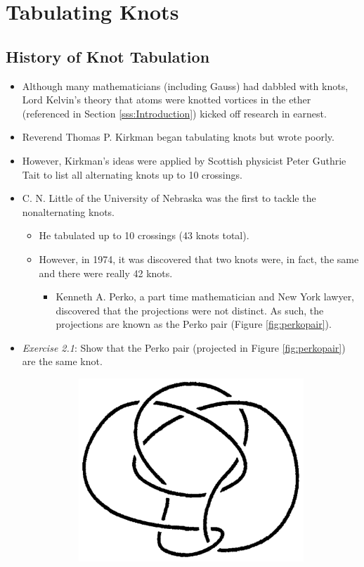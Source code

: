 \documentclass[titlepage]{article}
\numberwithin{figure}{section}
\numberwithin{table}{section}
\numberwithin{equation}{section}
\begin{document}
\section{Tabulating Knots}\label{sse:tabulating}
\subsection{History of Knot Tabulation}
\begin{itemize}
    \item Although many mathematicians (including Gauss) had dabbled with knots, Lord Kelvin's theory that atoms were knotted vortices in the ether (referenced in Section \ref{sss:Introduction}) kicked off research in earnest.
    \item Reverend Thomas P. Kirkman began tabulating knots but wrote poorly.
    \item However, Kirkman's ideas were applied by Scottish physicist Peter Guthrie Tait to list all alternating knots up to 10 crossings.
    \item C. N. Little of the University of Nebraska was the first to tackle the nonalternating knots.
    \begin{itemize}
        \item He tabulated up to 10 crossings (43 knots total).
        \item However, in 1974, it was discovered that two knots were, in fact, the same and there were really 42 knots.
        \begin{itemize}
            \item Kenneth A. Perko, a part time mathematician and New York lawyer, discovered that the projections were not distinct. As such, the projections are known as the Perko pair (Figure \ref{fig:perkopair}).
        \end{itemize}
    \end{itemize}
    \item \emph{Exercise 2.1}: Show that the Perko pair (projected in Figure \ref{fig:perkopair}) are the same knot.
    \begin{figure}[h!]
        \centering
        \begin{subfigure}[b]{0.2\linewidth}
            \centering
            \includegraphics[width=0.8\linewidth]{Blender/perkopair1.png}

\end{subfigure}
\end{figure}
\end{itemize}
\end{document}
